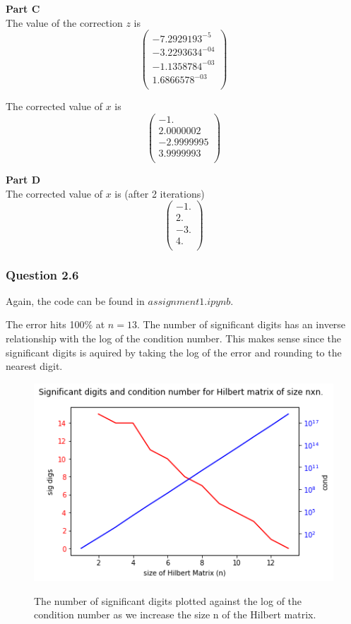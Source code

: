 \documentclass{article}
\begin{document}
\textbf{Part C}\\
The value of the correction $z$ is
$$\left( \begin{smallmatrix}
-7.2929193^{-5}\\
-3.2293634^{-04}\\
-1.1358784^{-03}\\
 1.6866578^{-03}\\
 \end{smallmatrix}
 \right)
$$

The corrected value of $x$ is
$$\left( \begin{smallmatrix}
	-1.\\
 2.0000002\\
-2.9999995\\
 3.9999993\\
  \end{smallmatrix}
 \right)
$$

\textbf{Part D}\\
The corrected value of $x$ is (after 2 iterations)
$$\left( \begin{smallmatrix}
	-1.\\
 2.\\
-3.\\
 4.\\
  \end{smallmatrix}
 \right)
$$


\subsubsection{Question 2.6}
Again, the code can be found in $assignment1.ipynb$.

The error hits 100\% at $n=13$. The number of significant digits has an
inverse relationship with the log of the condition number. This makes
sense since the significant digits is aquired by taking the log of the error and
rounding to the nearest digit.

\begin{figure}[H]
	\includegraphics[width=\textwidth]{cond_and_sigdigits.png} 
	\label{fig:q2_6CP}
	\caption{The number of significant digits plotted against the log of the condition number as we increase the size n of the Hilbert matrix.}
\end{figure}
\end{document}
